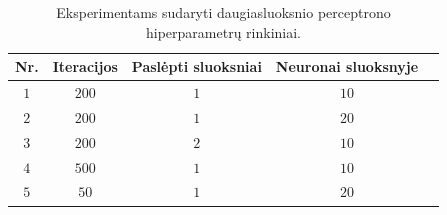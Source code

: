 \begin{table}[H]
    \centering
    \caption{Eksperimentams sudaryti daugiasluoksnio perceptrono hiperparametrų rinkiniai.}
    \begin{tabular}{|c|c|c|c|c|}
        \hline
        \textbf{Nr.} & \textbf{Iteracijos} & \textbf{Paslėpti sluoksniai} & \textbf{Neuronai sluoksnyje} \\
        \hline
        $1$ & $200$ & $1$ & $10$ \\ \hline
        $2$ & $200$ & $1$ & $20$ \\ \hline
        $3$ & $200$ & $2$ & $10$ \\ \hline
        $4$ & $500$ & $1$ & $10$ \\ \hline
        $5$ & $50$  & $1$ & $20$ \\ \hline
    \end{tabular}
    \label{tab:eksperimentu_rinkiniai}
\end{table}